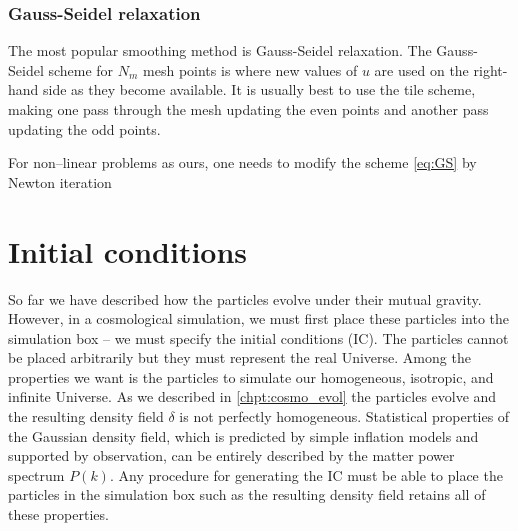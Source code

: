 \subsubsection{Gauss-Seidel relaxation}
The most popular smoothing method is Gauss-Seidel relaxation. The Gauss-Seidel scheme for $N_m$ mesh points is
where new values of $u$ are used on the right-hand side as they become available. It is usually best to use the tile scheme, making one pass through the mesh updating the even points and another pass updating the odd points.

For non--linear problems as ours, one needs to modify the scheme \eqref{eq:GS} by Newton iteration
\section{Initial conditions}
So far we have described how the particles evolve under their mutual gravity. However, in a cosmological simulation, we must first place these particles into the simulation box -- we must specify the initial conditions (IC). The particles cannot be placed arbitrarily but they must represent the real Universe. Among the properties we want is the particles to simulate our homogeneous, isotropic, and infinite Universe. As we described in \autoref{chpt:cosmo_evol} the particles evolve and the resulting density field $\delta$ is not perfectly homogeneous. Statistical properties of the Gaussian density field, which is predicted by simple inflation models and supported by observation, can be entirely described by the matter power spectrum $P(k)$. Any procedure for generating the IC must be able to place the particles in the simulation box such as the resulting density field retains all of these properties.


